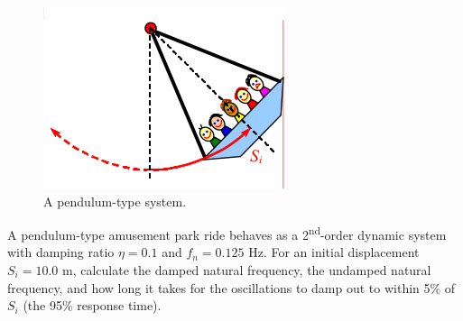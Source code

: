 \documentclass[a4paper,11pt,dvipsnames]{book}
\begin{document}
\begin{question}

\begin{figure}[h!]\label{fig:freebody}
\centering
  \includegraphics[width=0.3\linewidth]{penduleum}
  \caption{A pendulum-type system.} 
\end{figure}

A pendulum-type amusement park ride
behaves as a 2\textsuperscript{nd}-order dynamic system with damping ratio $\eta = 0.1$ and $f_n = 0.125$ Hz. For an initial displacement $S_i = 10.0$ m, calculate the damped natural frequency, the undamped natural frequency, and how long it takes for the oscillations to damp out to within 5\% of $S_i$ (the 95\% response time).

\examspace*{10em}

\end{question}
\begin{solution}


\end{solution}
\end{document}
